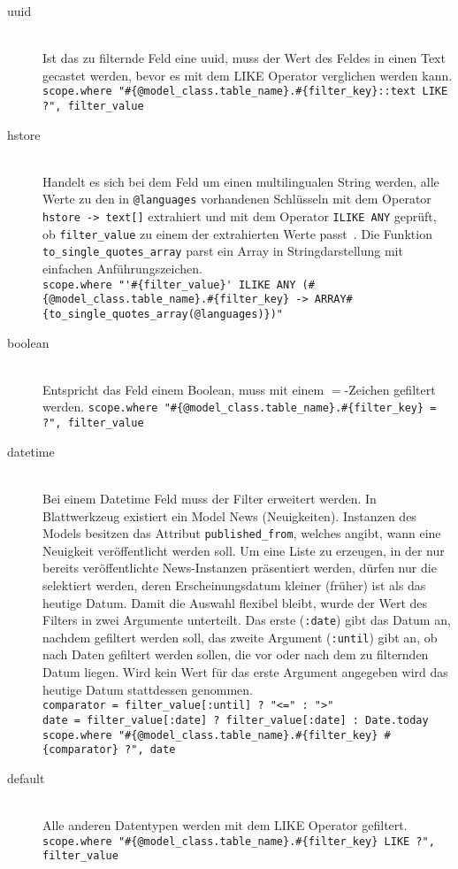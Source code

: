 \begin{description}
	\item[uuid] \ \\
		Ist das zu filternde Feld eine uuid, muss der Wert des Feldes in einen Text gecastet werden, bevor es mit dem LIKE Operator verglichen werden kann. \\
		\lstinline|scope.where "#{@model_class.table_name}.#{filter_key}::text LIKE ?", filter_value|
	\item[hstore] \ \\
		Handelt es sich bei dem Feld um einen multilingualen String werden, alle Werte zu den in \texttt{@languages} vorhandenen Schlüsseln mit dem Operator \texttt{hstore -> text[]} extrahiert und mit dem Operator \texttt{ILIKE ANY} geprüft, ob \texttt{filter\_value} zu einem der extrahierten Werte passt~\cite{ilike-any-postgres}.
		Die Funktion \texttt{to\-\_single\-\_quotes\-\_array} parst ein Array in Stringdarstellung mit einfachen Anführungszeichen.\\
		\lstinline|scope.where "'#{filter_value}' ILIKE ANY (#{@model_class.table_name}.#{filter_key} -> ARRAY#{to_single_quotes_array(@languages)})"|
	\item[boolean] \ \\
		Entspricht das Feld einem Boolean, muss mit einem $=$-Zeichen gefiltert werden.
		\lstinline|scope.where "#{@model_class.table_name}.#{filter_key} = ?", filter_value|
	\item[datetime] \ \\
		Bei einem Datetime Feld muss der Filter erweitert werden. In Blattwerkzeug existiert ein Model News (Neuigkeiten). Instanzen des Models besitzen das Attribut \texttt{published\_from}, welches angibt, wann eine Neuigkeit veröffentlicht werden soll. Um eine Liste zu erzeugen, in der nur bereits veröffentlichte News-Instanzen präsentiert werden, dürfen nur die selektiert werden, deren Erscheinungsdatum kleiner (früher) ist als das heutige Datum. Damit die Auswahl flexibel bleibt, wurde der Wert des Filters in zwei Argumente unterteilt. Das erste (\texttt{:date}) gibt das Datum an, nachdem gefiltert werden soll, das zweite Argument (\texttt{:until}) gibt an, ob nach Daten gefiltert werden sollen, die vor oder nach dem zu filternden Datum liegen. Wird kein Wert für das erste Argument angegeben wird das heutige Datum stattdessen genommen. \\
		\lstinline|comparator = filter_value[:until] ? "<=" : ">"| \\
		\lstinline|date = filter_value[:date] ? filter_value[:date] : Date.today| \\
		\lstinline|scope.where "#{@model_class.table_name}.#{filter_key} #{comparator} ?", date|
	\item[default] \ \\
		Alle anderen Datentypen werden mit dem LIKE Operator gefiltert. \\
		\lstinline|scope.where "#{@model_class.table_name}.#{filter_key} LIKE ?", filter_value|
\end{description}

